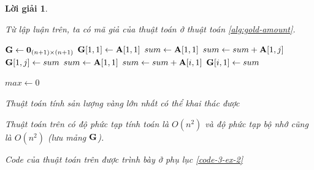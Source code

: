 \documentclass[14pt, a4paper]{article}
\theoremstyle{sltheorem}
\theoremstyle{soltheorem}
\newtheorem*{loigiai}{Lời giải}
\begin{document}
\begin{loigiai}
\begin{itemize} [label={$-$}]
        Từ lập luận trên, ta có mã giả của thuật toán ở thuật toán \ref{alg:gold-amount}.

        \begin{algorithm}[h!]
            \DontPrintSemicolon

            $\bold{G} \gets \bold{0}_{(n+1) \times (n+1)}$\;
            $\bold{G} \lbrack 1, 1 \rbrack \gets \bold{A} \lbrack 1, 1 \rbrack$\;
            $sum \gets \bold{A} \lbrack 1, 1 \rbrack$\;
             {
                $sum \gets sum + \bold{A} \lbrack 1, j \rbrack$\;
                $\bold{G} \lbrack 1, j \rbrack \gets sum$\;
            }
            $sum \gets \bold{A} \lbrack 1, 1 \rbrack$\;
             {
                $sum \gets sum + \bold{A} \lbrack i, 1 \rbrack$\;
                $\bold{G} \lbrack i, 1 \rbrack \gets sum$\;
            }

            $max \gets 0$\;
            \;
            \caption{Thuật toán tính sản lượng vàng lớn nhất có thể khai thác được}
            \label{alg:gold-amount}
        \end{algorithm}

        Thuật toán trên có độ phức tạp tính toán là $O(n^2)$ và độ phức tạp bộ nhớ cũng là $O(n^2)$ (lưu mảng $\bold{G}$).

        Code của thuật toán trên được trình bày ở phụ lục \ref{code-3-ex-2}


\end{itemize}
\end{loigiai}
\end{document}
